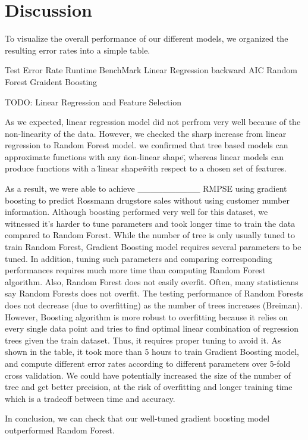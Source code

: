 \documentclass[letterpaper,twocolumn,10pt]{article}
\begin{document}
\section{Discussion}
To visualize the overall performance of our different models, we organized the resulting error rates into a simple table. 

                    Test Error Rate    Runtime
BenchMark
Linear Regression
  backward
  AIC
Random Forest
Graident Boosting

TODO: Linear Regression and Feature Selection 


As we expected, linear regression model did not perfrom very well because of the non-linearity of the data. However, we checked the sharp increase from linear regression to Random Forest model. we confirmed that tree based models can approximate functions with any \"non-linear shape\", whereas linear models can produce functions with a \"linear shape\" with respect to a chosen set of features. 

As a result, we were able to achieve __________ RMPSE using gradient boosting to predict Rossmann drugstore sales without using customer number information. Although boosting performed very well for this dataset, we witnessed it's harder to tune parameters and took longer time to train the data compared to Random Forest. While the number of tree is only usually tuned to train Random Forest, Gradient Boosting model requires several parameters to be tuned. In addition, tuning such parameters and comparing corresponding performances requires much more time than computing Random Forest algorithm. Also, Random Forest does not easily overfit. Often, many statisticans say Random Forests does not overfit. The testing performance of Random Forests does not decrease (due to overfitting) as the number of trees increases (Breiman). However, Boosting algorithm is more robust to overfitting because it relies on every single data point and tries to find optimal linear combination of regression trees given the train dataset. Thus, it requires proper tuning to avoid it. As shown in the table, it took more than 5 hours to train Gradient Boosting model, and compute different error rates according to different parameters over 5-fold cross validation. We could have potentially increased the size of the number of tree and get better precision, at the risk of overfitting and longer training time which is a tradeoff between time and accuracy.

In conclusion, we can check that our well-tuned gradient boosting model outperformed Random Forest. 
\end{document}
